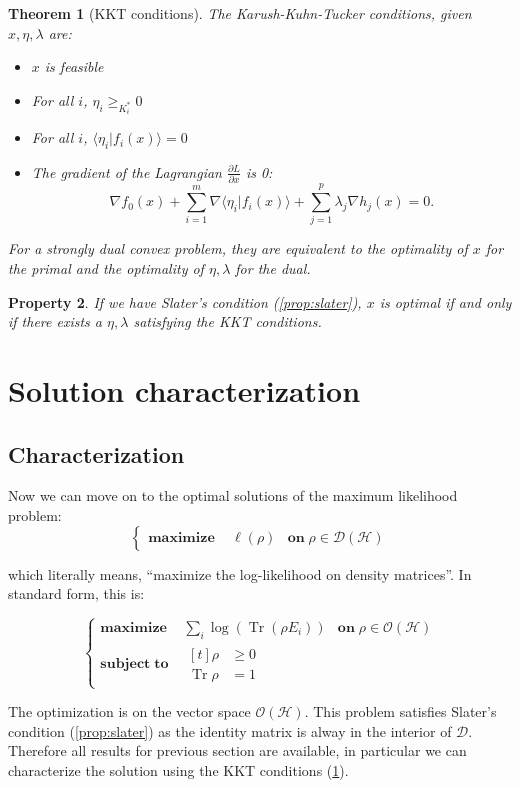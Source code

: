 \documentclass[10pt,a4paper]{report}
\theoremstyle{plain}
\newtheorem{thm}{Theorem}[chapter]
\newtheorem{prop}[thm]{Property}
\theoremstyle{definition}
\theoremstyle{remark}
\newcommand{\braket}[2]{\langle#1|#2\rangle}
\newcommand{\dpar}[2]{\frac{\partial{#1}}{\partial{#2}}}
\renewcommand{\geq}{\geqslant}
\DeclareMathOperator{\Tr}{Tr}
\newcommand{\maximf}[2]{\begin{cases}
    \mathbf{maximize}\,\quad #1& \mathbf{on}\; #2
  \end{cases}}
\newcommand{\maxima}[3]{\begin{cases}
    \mathbf{maximize}\,\quad #1& \mathbf{on}\; #2\\
    \mathbf{subject\;to}\quad \begin{aligned}[t]#3\end{aligned}
  \end{cases}}
\begin{document}
\begin{thm}[KKT conditions]\label{thm:KKT}
  The Karush-Kuhn-Tucker conditions, given $x,\eta,\lambda$ are:
  \begin{itemize}
  \item $x$ is feasible
  \item For all $i$, $\eta_i \geq_{K_i^*}0$
  \item For all $i$, $\braket {\eta_i}{f_i({x})} = 0$
  \item The gradient of the Lagrangian $\dpar L x$ is 0:
    \[ \nabla f_0(x) + \sum_{i = 1}^m \nabla\braket{\eta_i}{f_i(x)} +
      \sum_{j=1}^p \lambda_j \nabla h_j(x) = 0.\]
  \end{itemize}
  For a strongly dual convex problem, they are equivalent to the optimality of
  $x$ for the primal and the optimality of $\eta,\lambda$ for the dual.

\end{thm}

\begin{prop}\label{prop:slaterKKT}
  If we have Slater's condition (\ref{prop:slater}), $x$ is optimal if and only if there exists a
  $\eta,\lambda$ satisfying the KKT conditions.
\end{prop}

\section{Solution characterization}

\subsection{Characterization}

Now we can move on to the optimal solutions of the maximum likelihood problem:
\[\maximf{\ell(\rho)}{\rho \in \mathcal{D}(\mathcal{H})} \]

which literally means, ``maximize the log-likelihood on density matrices''. In
standard form, this is:

\[\maxima{\displaystyle\sum_i \log(\Tr(\rho E_i))}{\rho \in \mathcal{O}(\mathcal{H})}
  {\rho &\geq 0\\\Tr \rho &= 1}
\]

The optimization is on the vector space $\mathcal{O}(\mathcal{H})$. This problem
satisfies Slater's condition (\ref{prop:slater}) as the identity matrix is alway
in the interior of $\mathcal{D}$. Therefore all results for previous section are
available, in particular we can characterize the solution using the KKT
conditions (\ref{thm:KKT}).
\end{document}
